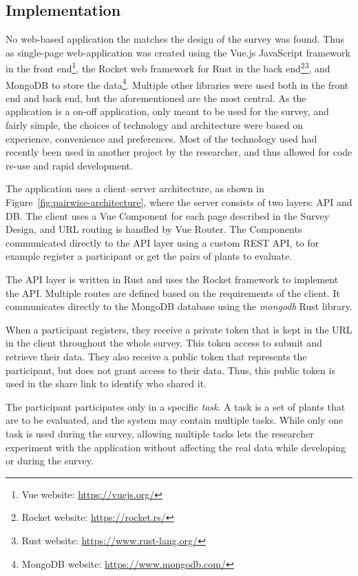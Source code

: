 \subsection{Implementation}
No web-based application the matches the design of the survey was found.
Thus as single-page web-application was created using the Vue.js JavaScript framework in the front end\footnote{Vue website: \url{https://vuejs.org/}}, the Rocket web framework for Rust in the back end\footnote{Rocket website: \url{https://rocket.rs/}}\footnote{Rust website: \url{https://www.rust-lang.org/}}, and MongoDB to store the data\footnote{MongoDB website: \url{https://www.mongodb.com/}}.
Multiple other libraries were used both in the front end and back end, but the aforementioned are the most central.
As the application is a on-off application, only meant to be used for the survey, and fairly simple, the choices of technology and architecture were based on experience, convenience and preferences.
Most of the technology used had recently been used in another project by the researcher, and thus allowed for code re-use and rapid development.

The application uses a client--server architecture, as shown in Figure~\ref{fig:pairwise-architecture}, where the server consists of two layers: API and DB.
The client uses a Vue Component for each page described in the Survey Design, and URL routing is handled by Vue Router.
The Components communicated directly to the API layer using a custom REST API, to for example register a participant or get the pairs of plants to evaluate.

The API layer is written in Rust and uses the Rocket framework to implement the API.
Multiple routes are defined based on the requirements of the client.
It communicates directly to the MongoDB database using the \textit{mongodb} Rust library.

When a participant registers, they receive a private token that is kept in the URL in the client throughout the whole survey.
This token access to submit and retrieve their data.
They also receive a public token that represents the participant, but does not grant access to their data.
Thus, this public token is used in the share link to identify who shared it.

The participant participates only in a specific \textit{task}.
A task is a set of plants that are to be evaluated, and the system may contain multiple tasks.
While only one task is used during the survey, allowing multiple tasks lets the researcher experiment with the application without affecting the real data while developing or during the survey.

